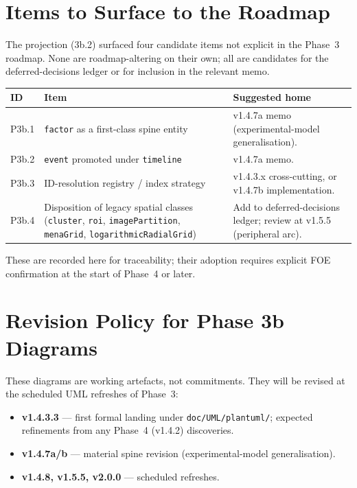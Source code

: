 \documentclass[11pt,a4paper]{article}
\begin{document}
\section{Items to Surface to the Roadmap}
\label{sec:roadmapfeedback}

The projection (3b.2) surfaced four candidate items not explicit in
the Phase~3 roadmap. None are roadmap-altering on their own; all are
candidates for the deferred-decisions ledger or for inclusion in the
relevant memo.

\begin{longtable}{p{0.8cm}p{6.0cm}p{7.5cm}}
\toprule
\textbf{ID} & \textbf{Item} & \textbf{Suggested home} \\
\midrule
\endhead
P3b.1 & \texttt{factor} as a first-class spine entity & v1.4.7a memo (experimental-model generalisation). \\
P3b.2 & \texttt{event} promoted under \texttt{timeline} & v1.4.7a memo. \\
P3b.3 & ID-resolution registry / index strategy & v1.4.3.x cross-cutting, or v1.4.7b implementation. \\
P3b.4 & Disposition of legacy spatial classes (\texttt{cluster}, \texttt{roi}, \texttt{imagePartition}, \texttt{menaGrid}, \texttt{logarithmicRadialGrid}) & Add to deferred-decisions ledger; review at v1.5.5 (peripheral arc). \\
\bottomrule
\end{longtable}

These are recorded here for traceability; their adoption requires
explicit FOE confirmation at the start of Phase~4 or later.

\section{Revision Policy for Phase 3b Diagrams}

These diagrams are working artefacts, not commitments. They will be
revised at the scheduled UML refreshes of Phase~3:

\begin{itemize}[nosep]
    \item \textbf{v1.4.3.3} --- first formal landing under \texttt{doc/UML/plantuml/}; expected refinements from any Phase~4 (v1.4.2) discoveries.
    \item \textbf{v1.4.7a/b} --- material spine revision (experimental-model generalisation).
    \item \textbf{v1.4.8, v1.5.5, v2.0.0} --- scheduled refreshes.
\end{itemize}
\end{document}
